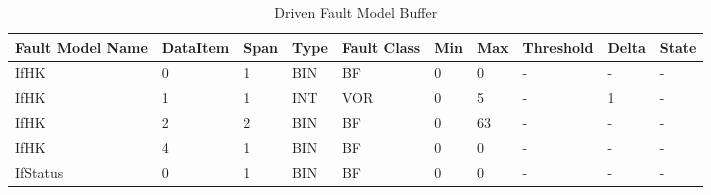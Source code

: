 \begin{table}[h]
\begin{center}
\small
\begin{tabular}{|p{1cm}|p{2cm}|p{1cm}|p{1cm}|p{1cm}|p{1cm}|p{1cm}|p{2cm}|p{1cm}|p{1cm}|}
\hline
\textbf{Fault Model Name}&\textbf{DataItem}&\textbf{Span}&\textbf{Type}&\textbf{Fault Class}&\textbf{Min}&\textbf{Max}&\textbf{Threshold}&\textbf{Delta}&\textbf{State}\\
\hline
IfHK&0&1&BIN&BF&0&0&-&-&-\\
IfHK&1&1&INT&VOR&0&5&-&1&-\\
IfHK&2&2&BIN&BF&0&63&-&-&-\\
IfHK&4&1&BIN&BF&0&0&-&-&-\\
\hline
IfStatus&0&1&BIN&BF&0&0&-&-&-\\
\hline
\end{tabular}
\end{center}
\caption{Driven Fault Model Buffer}
\label{table:faultModel:example}
\end{table}%